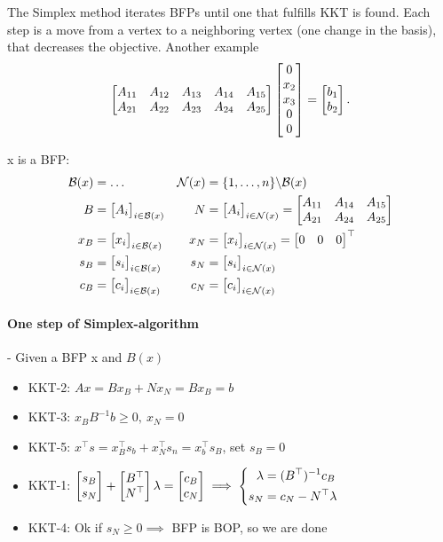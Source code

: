 \documentclass{article}
\begin{document}
\medskip The Simplex method iterates BFPs until one that fulfills KKT is found. Each step is a move from a vertex to a neighboring vertex (one change in the basis),
that decreases the objective. Another example
\[
  \begin{bmatrix} A_{11} & A_{12} & A_{13} & A_{14} & A_{15} \\ A_{21} & A_{22} & A_{23} & A_{24} & A_{25} \end{bmatrix} \begin{bmatrix} 0 \\ x_2 \\ x_3 \\ 0 \\ 0 \end{bmatrix} = \begin{bmatrix} b_1 \\ b_2 \end{bmatrix}
  .\]

x is a BFP:
\begin{align*}
  \mathcal{B}(x) &= \dots & \mathcal{N}(x) &= \{1, \dots, n\} \backslash \mathcal{B}(x) \\
  B &= \begin{bmatrix} A_i \end{bmatrix}_{i \in \mathcal{B}(x)} & N &= \begin{bmatrix} A_i \end{bmatrix}_{i \in \mathcal{N}(x)} = \begin{bmatrix} A_{11} & A_{14} & A_{15} \\ A_{21} & A_{24} & A_{25}  \end{bmatrix} \\
  x_B &= \begin{bmatrix} x_i \end{bmatrix}_{i\in \mathcal{B}(x)} & x_N &= \begin{bmatrix} x_i \end{bmatrix}_{i\in \mathcal{N}(x)} = \begin{bmatrix} 0 & 0 & 0 \end{bmatrix} ^{\top} \\
  s_B &= \begin{bmatrix} s_i \end{bmatrix}_{i\in \mathcal{B}(x)} & s_N &= \begin{bmatrix} s_i \end{bmatrix}_{i\in \mathcal{N}(x)} \\
  c_B &= \begin{bmatrix} c_i \end{bmatrix}_{i\in \mathcal{B}(x)} & c_N &= \begin{bmatrix} c_i \end{bmatrix}_{i\in \mathcal{N}(x)}
\end{align*}

\paragraph{One step of Simplex-algorithm}- Given a BFP x and $B(x)$
\begin{itemize}
  \item KKT-2: $Ax = Bx_B + Nx_N = Bx_B = b$
  \item KKT-3: $x_B B^{-1}b \geq 0,\  x_N = 0$
  \item KKT-5: $x^{\top}s = x_B^{\top}s_b + x_N^{\top}s_n = x_b^{\top}s_B$, set $s_B = 0$
  \item KKT-1: $\begin{bmatrix} s_B \\ s_N \end{bmatrix} + \begin{bmatrix} B^{\top} \\ N^{\top} \end{bmatrix}\lambda = \begin{bmatrix} c_B \\ c_N \end{bmatrix} \implies \left\{
    \begin{aligned}
      \lambda &= (B^{\top})^{-1}c_B \\
      s_N &= c_N - N^{\top}\lambda
    \end{aligned}
  \right.$
  \item KKT-4: Ok if $s_N  \geq 0 \implies$ BFP is BOP, so we are done
\end{itemize}
\end{document}
